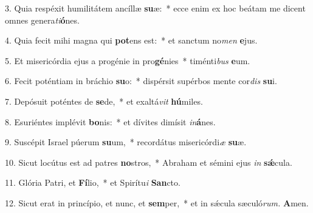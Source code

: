 \item 3. Quia respéxit humilitátem ancíllæ \textbf{su}æ:~* ecce enim ex hoc beátam me dicent omnes genera\hspace{0.03em}\textit{ti}\textbf{ó}nes.

\item 4. Quia fecit mihi magna qui \textbf{pot}ens est:~* et sanctum no\textit{men} \textbf{e}jus.

\item 5. Et misericórdia ejus a progénie in pro\textbf{gé}nies~* timénti\textit{bus} \textbf{e}um.

\item 6. Fecit poténtiam in bráchio \textbf{su}o:~* dispérsit supérbos mente cor\textit{dis} \textbf{su}i.

\item 7. Depósuit poténtes de \textbf{se}de,~* et exaltá\textit{vit} \textbf{hú}miles.

\item 8. Esuriéntes implévit \textbf{bo}nis:~* et dívites dimísit \textit{in}\textbf{á}nes.

\item 9. Suscépit Israel púerum \textbf{su}um,~* recordátus misericórdi\hspace{0.03em}\textit{æ} \textbf{su}æ.

\item 10. Sicut locútus est ad patres \textbf{no}stros,~* Abraham et sémini ejus \textit{in} \textbf{sǽ}cula.

\item 11. Glória Patri, et \textbf{Fí}lio,~* et Spirítu\hspace{0.03em}\textit{i} \textbf{San}cto.

\item 12. Sicut erat in princípio, et nunc, et \textbf{sem}per,~* et in sǽcula sæculó\textit{rum.} \textbf{A}men.